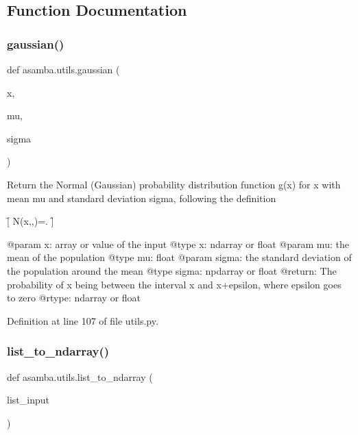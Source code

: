 \subsection{Function Documentation}
\mbox{\label{namespaceasamba_1_1utils_af0a79ac380cda69e73c44389a8a059d8}} 
\subsubsection{\texorpdfstring{gaussian()}{gaussian()}}
{\footnotesize\ttfamily def asamba.\+utils.\+gaussian (\begin{DoxyParamCaption}\item[{}]{x,  }\item[{}]{mu,  }\item[{}]{sigma }\end{DoxyParamCaption})}

\begin{DoxyVerb}Return the Normal (Gaussian) probability distribution function g(x) for x with mean mu and standard
deviation sigma, following the definition 

\f[
    N(x,\mu,\sigma)=\exp{}.
\f]

@param x: array or value of the input 
@type x: ndarray or float
@param mu: the mean of the population
@type mu: float
@param sigma: the standard deviation of the population around the mean
@type sigma: npdarray or float
@return: The probability of x being between the interval x and x+epsilon, where epsilon goes to zero
@rtype: ndarray or float
\end{DoxyVerb}
 

Definition at line 107 of file utils.\+py.

\mbox{\label{namespaceasamba_1_1utils_a28c2bc8cc997b1e6bb6fedc4ebc8cb2a}} 
\subsubsection{\texorpdfstring{list\+\_\+to\+\_\+ndarray()}{list\_to\_ndarray()}}
{\footnotesize\ttfamily def asamba.\+utils.\+list\+\_\+to\+\_\+ndarray (\begin{DoxyParamCaption}\item[{}]{list\+\_\+input }\end{DoxyParamCaption})}

